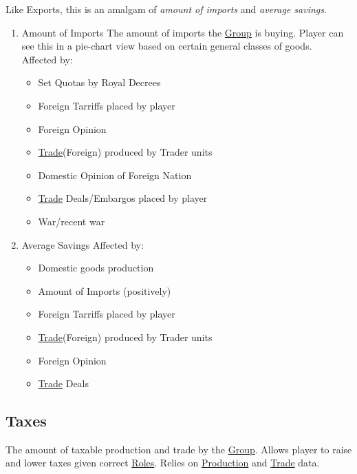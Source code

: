 \documentclass[11pt]{article}
\begin{document}
Like Exports, this is an amalgam of \emph{amount of imports} and \emph{average savings}.\\
\begin{enumerate}
\item Amount of Imports
\label{sec:orga424602}
The amount of imports the \hyperref[org3bac9f0]{Group} is buying. Player can see this in a pie-chart view based on certain general classes of goods.\\
Affected by:\\
\begin{itemize}
\item Set Quotas by Royal Decrees\\
\item Foreign Tarriffs placed by player\\
\item Foreign Opinion\\
\item \hyperref[orgdbeaa2d]{Trade}(Foreign) produced by Trader units\\
\item Domestic Opinion of Foreign Nation\\
\item \hyperref[orgdbeaa2d]{Trade} Deals/Embargos placed by player\\
\item War/recent war\\
\end{itemize}
\item Average Savings
\label{sec:org7a803d2}
Affected by:\\
\begin{itemize}
\item Domestic goods production\\
\item Amount of Imports (positively)\\
\item Foreign Tarriffs placed by player\\
\item \hyperref[orgdbeaa2d]{Trade}(Foreign) produced by Trader units\\
\item Foreign Opinion\\
\item \hyperref[orgdbeaa2d]{Trade} Deals\\
\end{itemize}
\end{enumerate}
\subsection{Taxes \label{orgda74c98}}
\label{sec:org359cd56}
The amount of taxable production and trade by the \hyperref[org3bac9f0]{Group}. Allows player to raise and lower taxes given correct \hyperref[org080bb13]{Roles}. Relies on \hyperref[org9bdc7c2]{Production} and \hyperref[orgdbeaa2d]{Trade} data.\\
\end{document}
